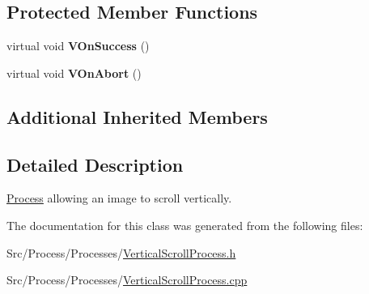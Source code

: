 \subsection*{Protected Member Functions}
\begin{DoxyCompactItemize}
\item 
\hypertarget{classVerticalScrollProcess_a0867b6c87af154566135e6c6ba319f07}{virtual void {\bfseries V\-On\-Success} ()}\label{classVerticalScrollProcess_a0867b6c87af154566135e6c6ba319f07}

\item 
\hypertarget{classVerticalScrollProcess_ad305b2f65d92b94ae7b8ee27a1b4e241}{virtual void {\bfseries V\-On\-Abort} ()}\label{classVerticalScrollProcess_ad305b2f65d92b94ae7b8ee27a1b4e241}

\end{DoxyCompactItemize}
\subsection*{Additional Inherited Members}


\subsection{Detailed Description}
\hyperlink{classProcess}{Process} allowing an image to scroll vertically. 

The documentation for this class was generated from the following files\-:\begin{DoxyCompactItemize}
\item 
Src/\-Process/\-Processes/\hyperlink{VerticalScrollProcess_8h}{Vertical\-Scroll\-Process.\-h}\item 
Src/\-Process/\-Processes/\hyperlink{VerticalScrollProcess_8cpp}{Vertical\-Scroll\-Process.\-cpp}\end{DoxyCompactItemize}
